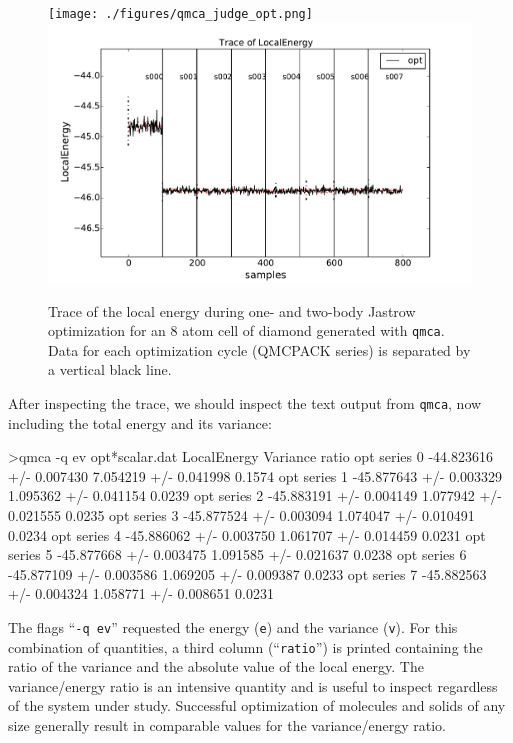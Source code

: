 \begin{figure}
\begin{center}
\ifdefined\HCode  
\texttt{[image: ./figures/qmca\_judge\_opt.png]}
\else
\includegraphics[trim = 0mm 0mm 0mm 0mm, clip,width=0.9\columnwidth]{./figures/qmca_judge_opt.pdf}
\fi
\end{center}
\caption{Trace of the local energy during one- and two-body Jastrow optimization for an 8 atom cell of diamond generated with \texttt{qmca}.  Data for each optimization cycle (QMCPACK series) is separated by a vertical black line.
}
\label{fig:qmca_judge_opt}
\end{figure}

After inspecting the trace, we should inspect the text output 
from \texttt{qmca}, now including the total energy and its variance:
\begin{shade}
>qmca -q ev opt*scalar.dat
                            LocalEnergy               Variance           ratio 
opt  series 0  -44.823616 +/- 0.007430   7.054219 +/- 0.041998   0.1574 
opt  series 1  -45.877643 +/- 0.003329   1.095362 +/- 0.041154   0.0239 
opt  series 2  -45.883191 +/- 0.004149   1.077942 +/- 0.021555   0.0235 
opt  series 3  -45.877524 +/- 0.003094   1.074047 +/- 0.010491   0.0234 
opt  series 4  -45.886062 +/- 0.003750   1.061707 +/- 0.014459   0.0231 
opt  series 5  -45.877668 +/- 0.003475   1.091585 +/- 0.021637   0.0238 
opt  series 6  -45.877109 +/- 0.003586   1.069205 +/- 0.009387   0.0233 
opt  series 7  -45.882563 +/- 0.004324   1.058771 +/- 0.008651   0.0231 
\end{shade}
\noindent
The flags ``\texttt{-q ev}'' requested the energy (\texttt{e}) and 
the variance (\texttt{v}).  For this combination of quantities, a 
third column (``\texttt{ratio}'') is printed containing the ratio 
of the variance and the absolute value of the local energy.
The variance/energy ratio is an intensive quantity and is useful  
to inspect regardless of the system under study.  Successful 
optimization of molecules and solids of any size generally result 
in comparable values for the variance/energy ratio. 

